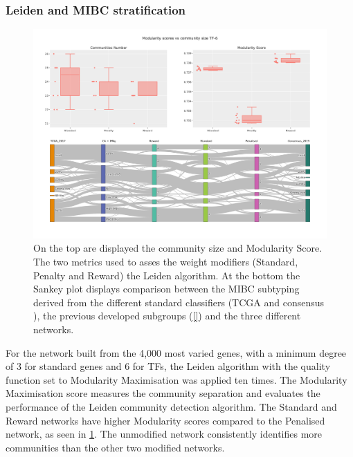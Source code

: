 \subsubsection{Leiden and MIBC stratification} \label{s:N_I:tum_stratification}

\begin{figure}[!htb]    \centering\includegraphics[width=1.0\textwidth,height=0.6\textheight,keepaspectratio]{Sections/Network_I/Resources/Tum_network/LeidenMetrics_Sankey_TF-6.png}
    \caption{On the top are displayed the community size and Modularity Score. The two metrics used to asses the weight modifiers (Standard, Penalty and Reward) the Leiden algorithm. At the bottom the Sankey plot displays comparison between the MIBC subtyping derived from the different standard classifiers (TCGA \citet{Robertson2017-mg} and consensus \citet{Kamoun2020-tj}), the previous developed subgroups (\ref{}) and the three different networks. }
    \label{fig:N_I:tum_leiden_modifiers}
\end{figure}


For the network built from the 4,000 most varied genes, with a minimum degree of 3 for standard genes and 6 for TFs, the Leiden algorithm with the quality function set to Modularity Maximisation was applied ten times. The Modularity Maximisation score measures the community separation and evaluates the performance of the Leiden community detection algorithm. The Standard and Reward networks have higher Modularity scores compared to the Penalised network, as seen in \cref{fig:N_I:tum_leiden_modifiers}. The unmodified network consistently identifies more communities than the other two modified networks.

